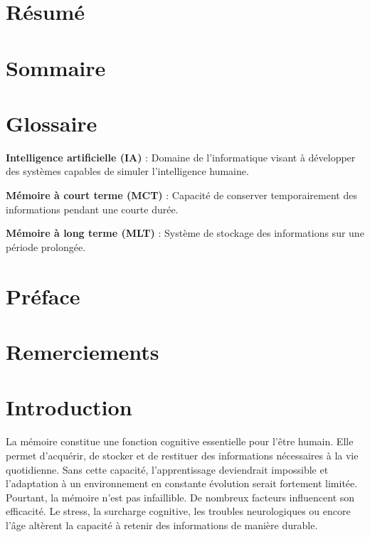 \documentclass[12pt,a4paper]{report}
\begin{document}
\chapter*{Résumé}

\chapter*{Sommaire}
\tableofcontents

\listoffigures
\listoftables
\newpage

\chapter*{Glossaire}

\textbf{Intelligence artificielle (IA)} : Domaine de l'informatique visant à développer des systèmes capables de simuler l'intelligence humaine.

\textbf{Mémoire à court terme (MCT)} : Capacité de conserver temporairement des informations pendant une courte durée.

\textbf{Mémoire à long terme (MLT)} : Système de stockage des informations sur une période prolongée.

\chapter*{Préface}

\chapter*{Remerciements}

\chapter*{Introduction}

La mémoire constitue une fonction cognitive essentielle pour l'être humain. Elle permet d'acquérir, de stocker et de restituer des informations nécessaires à la vie quotidienne. Sans cette capacité, l'apprentissage deviendrait impossible et l'adaptation à un environnement en constante évolution serait fortement limitée. Pourtant, la mémoire n'est pas infaillible. De nombreux facteurs influencent son efficacité. Le stress, la surcharge cognitive, les troubles neurologiques ou encore l'âge altèrent la capacité à retenir des informations de manière durable.
\end{document}
